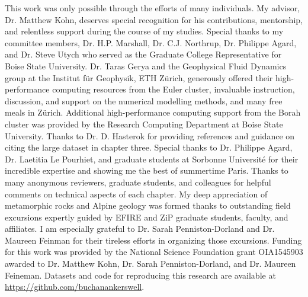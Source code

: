 This work was only possible through the efforts of many individuals. My advisor, Dr. Matthew Kohn, deserves special recognition for his contributions, mentorship, and relentless support during the course of my studies. Special thanks to my committee members, Dr. H.P. Marshall, Dr. C.J. Northrup, Dr. Philippe Agard, and Dr. Steve Utych who served as the Graduate College Representative for Boise State University. Dr. Taras Gerya and the Geophysical Fluid Dynamics group at the Institut für Geophysik, ETH Zürich, generously offered their high-performance computing resources from the Euler cluster, invaluable instruction, discussion, and support on the numerical modelling methods, and many free meals in Zürich. Additional high-performance computing support from the Borah cluster was provided by the Research Computing Department at Boise State University. Thanks to Dr. D. Hasterok for providing references and guidance on citing the large dataset in chapter three. Special thanks to Dr. Philippe Agard, Dr. Laetitia Le Pourhiet, and graduate students at Sorbonne Université for their incredible expertise and showing me the best of summertime Paris. Thanks to many anonymous reviewers, graduate students, and colleagues for helpful comments on technical aspects of each chapter. My deep appreciation of metamorphic rocks and Alpine geology was formed thanks to outstanding field excursions expertly guided by EFIRE and ZiP graduate students, faculty, and affiliates. I am especially grateful to Dr. Sarah Penniston-Dorland and Dr. Maureen Feinman for their tireless efforts in organizing those excursions. Funding for this work was provided by the National Science Foundation grant OIA1545903 awarded to Dr. Matthew Kohn, Dr. Sarah Penniston-Dorland, and Dr. Maureen Feineman. Datasets and code for reproducing this research are available at \url{https://github.com/buchanankerswell}.